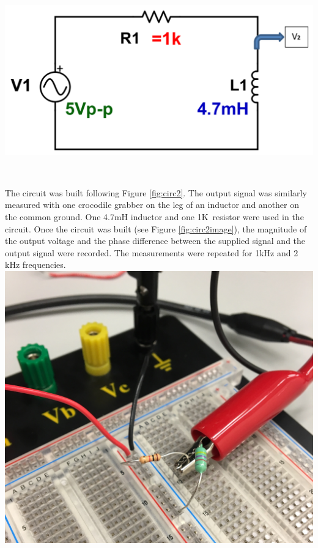 \documentclass[journal]{IEEEtran}
\begin{document}
\begingroup
    \centering
    \medskip
    \includegraphics[width=\columnwidth]{images/lab8_circuit2.png}
    \label{fig:circ2}
    \medskip
\endgroup

\\
\medskip


\noindent The circuit was built following Figure \ref{fig:circ2}. The output signal was similarly measured with one crocodile grabber on the leg of an inductor and another on the common ground. One 4.7mH inductor and one 1K\ohm \, resistor were used in the circuit. Once the circuit was built (see Figure \ref{fig:circ2image}), the magnitude of the output voltage and the phase difference between the supplied signal and the output signal were recorded. The measurements were repeated for 1kHz and 2 kHz frequencies. \\

\begingroup
    \centering
    \medskip
    \includegraphics[width=\columnwidth]{images/lab8_circ2.jpg}
    \label{fig:circ2image}
    \medskip
\endgroup
\end{document}
